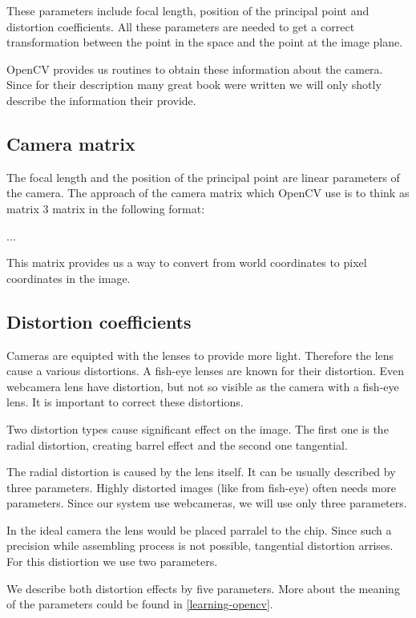 These parameters include focal length, position of the principal point and
distortion coefficients. All these parameters are needed to get a correct
transformation between the point in the space and the point at the image plane.

OpenCV provides us routines to obtain these information about the camera. Since
for their description many great book were written we will only shotly describe
the information their provide.

\subsection{Camera matrix}
The focal length and the position of the principal point are linear parameters
of the camera.  The approach of the camera matrix which OpenCV use is to think
as matrix 3 matrix in the following format:

...

This matrix provides us a way to convert from world coordinates to pixel
coordinates in the image.

\subsection{Distortion coefficients}

Cameras are equipted with the lenses to provide more light. Therefore the lens
cause a various distortions. A fish-eye lenses are known for their distortion.
Even webcamera lens have distortion, but not so visible as the camera with a
fish-eye lens. It is important to correct these distortions.

Two distortion types cause significant effect on the image. The first one is the
radial distortion, creating barrel effect and the second one tangential.

The radial distortion is caused by the lens itself. It can be usually described
by three parameters. Highly distorted images (like from fish-eye) often needs
more parameters.  Since our system use webcameras, we will use only three
parameters.

In the ideal camera the lens would be placed parralel to the chip. Since such a
precision while assembling process is not possible, tangential distortion
arrises. For this distiortion we use two parameters.

We describe both distortion effects by five parameters. More about the meaning
of the parameters could be found in \ref{learning-opencv}.

